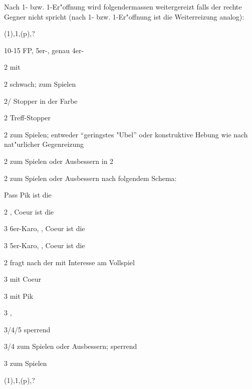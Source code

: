 \begin{appendix}
Nach 1\tre{}- bzw. 1\coe{}-Er"offnung wird folgendermassen weitergereizt falls
der rechte Gegner nicht spricht (nach 1\kar{}- bzw. 1\pik{}-Er"offnung ist die
Weiterreizung analog):

\bdsc
	\item[(1\tre)\sep{}1\SA{}\sep{}(p)\sep{}?]~
		
		10-15 FP, 5\pl{}er-\ka, genau 4er-\ofa
		\bdsc
			\item[2\tre] \inv{}\pl mit \ka
				\bdsc
					\item[2\kar] schwach; zum Spielen
					\item[2\coe/\pi] Stopper in der Farbe
					\item[2\SA] Treff-Stopper
				\edsc
			\item[2\kar] zum Spielen; entweder "`geringstes "Ubel"'
oder konstruktive Hebung wie nach nat"urlicher Gegenreizung
			\item[2\coe] zum Spielen oder Ausbessern in 2\pik
			\item[2\pik] zum Spielen oder Ausbessern nach folgendem
Schema:
				\bdsc
					\item[Pass] Pik ist die \ofa
					\item[2\SA] \maxi, Coeur ist die \ofa
					\item[3\kar] 6\pl{}er-Karo, \mini, Coeur
ist die \ofa
					\item[3\coe] 5er-Karo, \mini, Coeur ist
die \ofa
				\edsc
			\item[2\SA] fragt nach der \ofa mit Interesse am
Vollspiel
				\bdsc
					\item[3\tre] \maxi mit Coeur
					\item[3\kar] \maxi mit Pik
					\item[3\of] \nat, \mini
				\edsc
			\item[3\kar/4\kar/5\kar] sperrend
			\item[3\of/4\of] zum Spielen oder Ausbessern; sperrend
			\item[3\SA] zum Spielen
			
		\edsc
	\item[(1\coe)\sep{}1\SA{}\sep{}(p)\sep{}?]~


\end{appendix}
